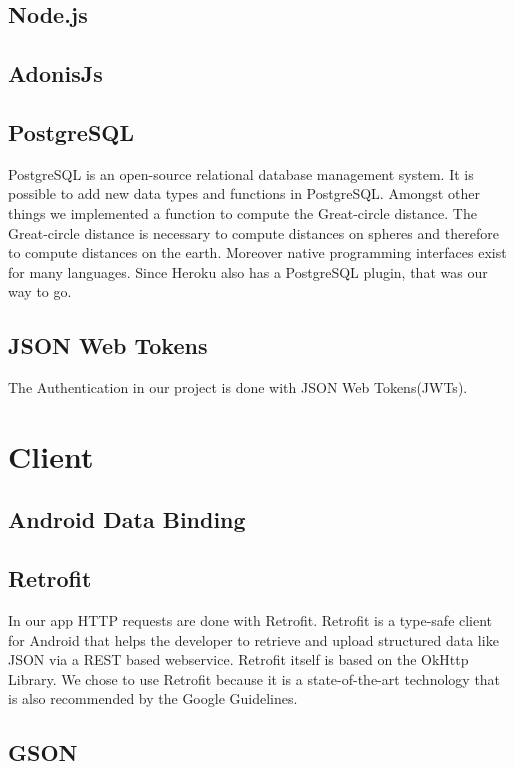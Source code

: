 \documentclass[11pt, accentcolor=tud1c]{tudreport}
\begin{document}
\subsection{Node.js}
\cite{nodejs}
\subsection{AdonisJs}\label{sec:adonisjs}
\cite{adonisjs}
\subsection{PostgreSQL}
PostgreSQL\cite{postgresql} is an open-source relational database management system. It is possible to add new data types and functions in PostgreSQL. Amongst other things we implemented a function to compute the Great-circle distance\cite{greatcircledist}. The Great-circle distance is necessary to compute distances on spheres and therefore to compute distances on the earth. Moreover native programming interfaces exist for many languages. Since Heroku also has a PostgreSQL plugin, that was our way to go.
\subsection{JSON Web Tokens}\label{sec:json_web_tokens}
The Authentication in our project is done with JSON Web Tokens(JWTs)\cite{jwt}.

\section{Client}\label{sec:client}
\subsection{Android Data Binding}
\cite{databinding}
\subsection{Retrofit}
In our app HTTP requests are done with Retrofit\cite{retrofit}. Retrofit is a type-safe client for Android that helps the developer to retrieve and upload structured data like JSON via a REST based webservice. Retrofit itself is based on the OkHttp Library. We chose to use Retrofit because it is a state-of-the-art technology that is also recommended by the Google Guidelines.
\subsection{GSON}
\cite{gson}
\end{document}
